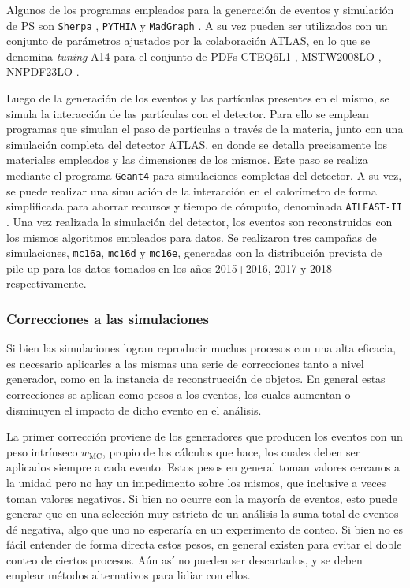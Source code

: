 Algunos de los programas empleados para la generación de eventos y simulación de PS son \texttt{Sherpa} \cite{SherpaGen, Schumann:2007mg, Bothmann:2019yzt}, \texttt{PYTHIA} \cite{Sjostrand:2014zea} y \texttt{MadGraph} \cite{Alwall:2014hca}. A su vez pueden ser utilizados con un conjunto de parámetros ajustados por la colaboración ATLAS, en lo que se denomina \textit{tuning} A14 \cite{ATL-PHYS-PUB-2014-021} para el conjunto de PDFs CTEQ6L1 \cite{cteq}, MSTW2008LO \cite{mstw1, mstw2, mstw3}, NNPDF23LO \cite{nnpdf}. 


Luego de la generación de los eventos y las partículas presentes en el mismo, se simula la interacción de las partículas con el detector. 
Para ello se emplean programas que simulan el paso de partículas a través de la materia, junto con una simulación completa del detector ATLAS, en donde se detalla precisamente los materiales empleados y las dimensiones de los mismos. Este paso se realiza mediante el programa \texttt{Geant4} \cite{Geant4} para simulaciones completas del detector. A su vez, se puede realizar una simulación de la interacción en el calorímetro de forma simplificada para ahorrar recursos y tiempo de cómputo, denominada \texttt{ATLFAST-II} \cite{Richter-Was:683751,Lukas_2012}. Una vez realizada la simulación del detector, los eventos son reconstruidos con los mismos algoritmos empleados para datos. Se realizaron tres campañas de simulaciones, \texttt{mc16a}, \texttt{mc16d} y \texttt{mc16e}, generadas con la distribución prevista de pile-up para los datos tomados en los años 2015+2016, 2017 y 2018 respectivamente.






\subsubsection{Correcciones a las simulaciones}\label{sec:mc_weights}

Si bien las simulaciones logran reproducir muchos procesos con una alta eficacia, es necesario aplicarles a las mismas una serie de correcciones tanto a nivel generador, como en la instancia de reconstrucción de objetos. En general estas correcciones se aplican como pesos a los eventos, los cuales aumentan o disminuyen el impacto de dicho evento en el análisis.

La primer corrección proviene de los generadores que producen los eventos con un peso intrínseco $w_\text{MC}$, propio de los cálculos que hace, los cuales deben ser aplicados siempre a cada evento. Estos pesos en general toman valores cercanos a la unidad pero no hay un impedimento sobre los mismos, que inclusive a veces toman valores negativos. Si bien no ocurre con la mayoría de eventos, esto puede generar que en una selección muy estricta de un análisis la suma total de eventos dé negativa, algo que uno no esperaría en un experimento de conteo. Si bien no es fácil entender de forma directa estos pesos, en general existen para evitar el doble conteo de ciertos procesos. Aún así no pueden ser descartados, y se deben emplear métodos alternativos para lidiar con ellos.

